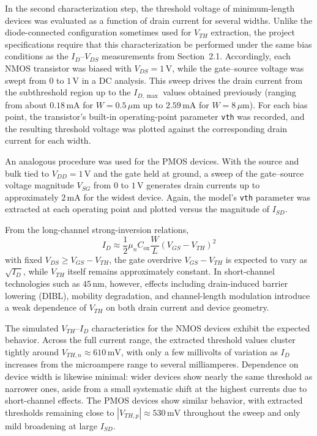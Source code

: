 \documentclass[11pt]{article}
\begin{document}
In the second characterization step, the threshold voltage of minimum-length
devices was evaluated as a function of drain current for several widths. Unlike
the diode-connected configuration sometimes used for $V_{TH}$ extraction, the
project specifications require that this characterization be performed under the
same bias conditions as the $I_D$--$V_{DS}$ measurements from Section~2.1.
Accordingly, each NMOS transistor was biased with $V_{DS}=1\,\mathrm{V}$, while
the gate--source voltage was swept from $0$ to $1\,\mathrm{V}$ in a DC analysis.
This sweep drives the drain current from the subthreshold region up to the
$I_{D,\max}$ values obtained previously (ranging from about $0.18\,\mathrm{mA}$
for $W=0.5\,\mu\mathrm{m}$ up to $2.59\,\mathrm{mA}$ for $W=8\,\mu\mathrm{m}$).
For each bias point, the transistor’s built-in operating-point parameter
\texttt{vth} was recorded, and the resulting threshold voltage was plotted
against the corresponding drain current for each width.

An analogous procedure was used for the PMOS devices. With the source and bulk
tied to $V_{DD}=1\,\mathrm{V}$ and the gate held at ground, a sweep of the
gate--source voltage magnitude $V_{SG}$ from $0$ to $1\,\mathrm{V}$ generates
drain currents up to approximately $2\,\mathrm{mA}$ for the widest device.
Again, the model’s \texttt{vth} parameter was extracted at each operating point
and plotted versus the magnitude of $I_{SD}$.

From the long-channel strong-inversion relations,
\[
  I_D \approx \frac{1}{2}\mu_n C_{\mathrm{ox}} \frac{W}{L}(V_{GS}-V_{TH})^2
\]
with fixed $V_{DS} \ge V_{GS}-V_{TH}$, the gate overdrive $V_{GS}-V_{TH}$ is
expected to vary as $\sqrt{I_D}$, while $V_{TH}$ itself remains approximately
constant. In short-channel technologies such as $45\,\mathrm{nm}$, however,
effects including drain-induced barrier lowering (DIBL), mobility degradation,
and channel-length modulation introduce a weak dependence of $V_{TH}$ on both
drain current and device geometry.

The simulated $V_{TH}$--$I_D$ characteristics for the NMOS devices exhibit the
expected behavior. Across the full current range, the extracted threshold values
cluster tightly around $V_{TH,n} \approx 610\,\mathrm{mV}$, with only a few
millivolts of variation as $I_D$ increases from the microampere range to several
milliamperes. Dependence on device width is likewise minimal: wider devices show
nearly the same threshold as narrower ones, aside from a small systematic shift
at the highest currents due to short-channel effects. The PMOS devices show
similar behavior, with extracted thresholds remaining close to
$|V_{TH,p}| \approx 530\,\mathrm{mV}$ throughout the sweep and only mild
broadening at large $I_{SD}$.
\end{document}
